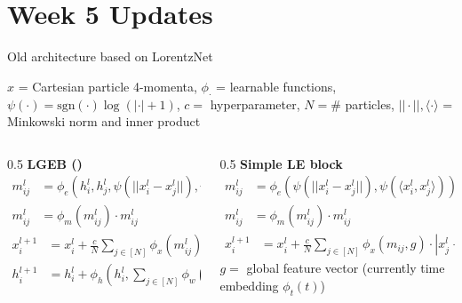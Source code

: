 \documentclass[handout, aspectratio=169,xcolor=dvipsnames]{beamer}
\begin{document}
\section{Week 5 Updates}


\begin{frame}{Old architecture based on LorentzNet}

    $x$ = Cartesian particle 4-momenta, $\phi_\cdot$ = learnable functions, $\psi(\cdot) = \text{sgn}(\cdot) \log(|\cdot| + 1)$, $c = $ hyperparameter, $N = \#$ particles, $|| \cdot ||, \langle \cdot \rangle$ = Minkowski norm and inner product
    \vspace{0.5cm}
    \begin{columns}
        \begin{column}{0.5\textwidth}
            \textbf{LGEB (\cite{gongEfficientLorentzEquivariant2022})}
            \begin{align*}
                m_{ij}^l &= \phi_e(h_i^l, h_j^l, \psi(||x_i^l - x_j^l||), \psi(\langle x_i^l, x_j^l \rangle)) \\
                m_{ij}^l &= \phi_m(m_{ij}^l) \cdot m_{ij}^l
            \end{align*}
            \begin{align*}
                x_i^{l+1} &= x_i^l + \frac{c}{N} \sum\limits_{j \in [N]} \phi_x(m_{ij}^l) \cdot |x_i - x_j|         
            \end{align*}
            \begin{align*}
                h_i^{l+1} &= h_i^l + \phi_h(h_i^l, \sum\limits_{j \in [N]} \phi_w(m_{ij}^l) m_{ij}^l)
            \end{align*}
        \end{column}
        \begin{column}{0.5\textwidth}
            \textbf{Simple LE block}
            \begin{align*}
                m^l_{ij} &= \phi_e(\psi(||x_i^l - x_j^l||), \psi(\langle x_i^l, x_j^l \rangle))\\
                m^l_{ij} &= \phi_m(m^l_{ij}) \cdot m^l_{ij}
            \end{align*}
            \begin{align*}
                x_i^{l+1} &= x_i^l + \frac{c}{N} \sum\limits_{j \in [N]} \phi_x(m_{ij}, g) \cdot |x_j^l - x_i^l|
            \end{align*}
            $g = $ global feature vector (currently time embedding $\phi_t(t)$)
        \end{column}
    \end{columns}
\end{frame}
\end{document}
